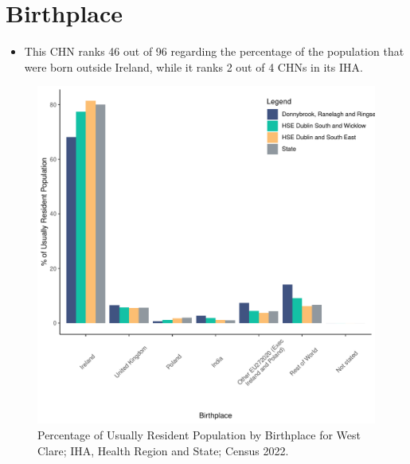\documentclass{article}
\begin{document}
\section{Birthplace}\label{sect:Birth}
\begin{itemize}
\item This CHN ranks  46 out of 96 regarding the percentage of the population that were born outside Ireland, while it ranks  2 out of 4 CHNs in its IHA.
\end{itemize}
\begin{figure}[H]
	\centering
	\includegraphics[width = 130mm]{../figures/BirthED.pdf}
	\caption{Percentage of Usually Resident Population by Birthplace for West Clare; IHA, Health Region and State; Census 2022.}
	\label{fig:vbnv}
	\end{figure}
	
\end{document}
